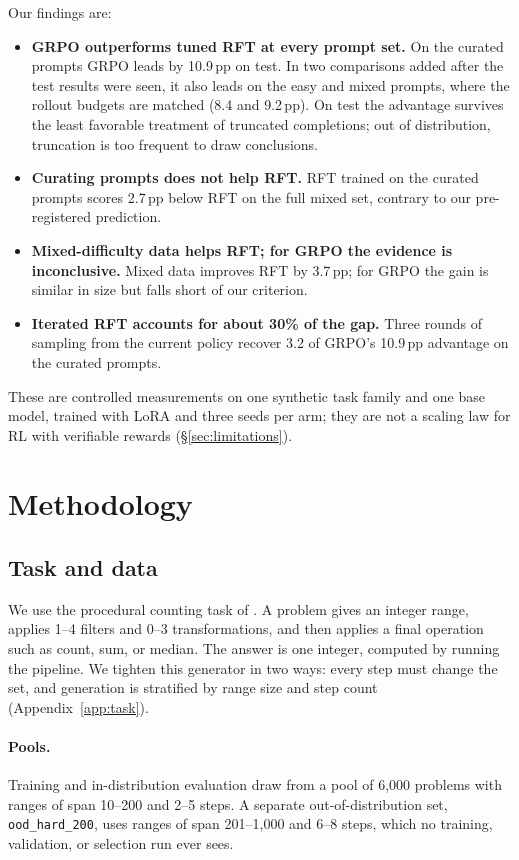 \documentclass{article}
\begin{document}
Our findings are:
\begin{itemize}
  \item \textbf{GRPO outperforms tuned RFT at every prompt set.} On the curated prompts GRPO leads by 10.9\,pp on test. In two comparisons added after the test results were seen, it also leads on the easy and mixed prompts, where the rollout budgets are matched (8.4 and 9.2\,pp). On test the advantage survives the least favorable treatment of truncated completions; out of distribution, truncation is too frequent to draw conclusions.
  \item \textbf{Curating prompts does not help RFT.} RFT trained on the curated prompts scores 2.7\,pp below RFT on the full mixed set, contrary to our pre-registered prediction.
  \item \textbf{Mixed-difficulty data helps RFT; for GRPO the evidence is inconclusive.} Mixed data improves RFT by 3.7\,pp; for GRPO the gain is similar in size but falls short of our criterion.
  \item \textbf{Iterated RFT accounts for about 30\% of the gap.} Three rounds of sampling from the current policy recover 3.2 of GRPO's 10.9\,pp advantage on the curated prompts.
\end{itemize}

These are controlled measurements on one synthetic task family and one base model, trained with LoRA and three seeds per arm; they are not a scaling law for RL with verifiable rewards (\S\ref{sec:limitations}).

\section{Methodology}

\label{sec:methodology}

\subsection{Task and data}
\label{sec:data}

We use the procedural counting task of \citet{bauer2026}. A problem gives an integer range, applies 1--4 filters and 0--3 transformations, and then applies a final operation such as count, sum, or median. The answer is one integer, computed by running the pipeline. We tighten this generator in two ways: every step must change the set, and generation is stratified by range size and step count (Appendix~\ref{app:task}).

\paragraph{Pools.} Training and in-distribution evaluation draw from a pool of 6{,}000 problems with ranges of span 10--200 and 2--5 steps. A separate out-of-distribution set, \texttt{ood\_hard\_200}, uses ranges of span 201--1{,}000 and 6--8 steps, which no training, validation, or selection run ever sees.
\end{document}
